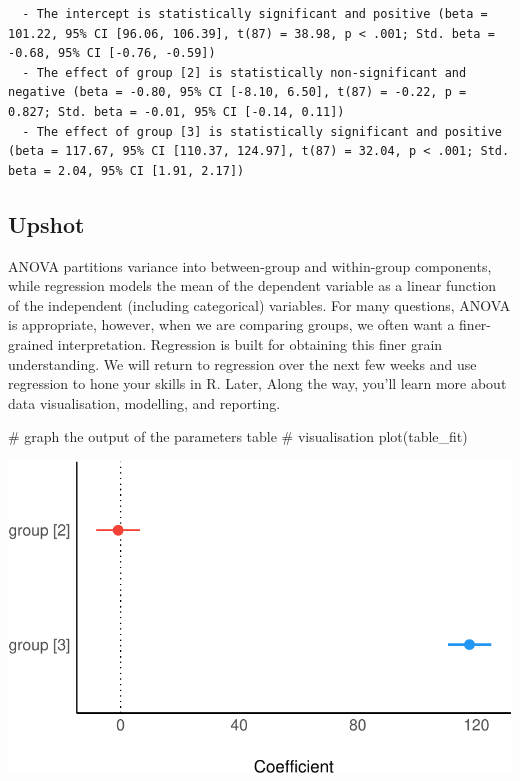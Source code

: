 \documentclass[
  singlecolumn]{article}
\newenvironment{Shaded}{}{}
\newcommand{\CommentTok}[1]{\textcolor[rgb]{0.42,0.45,0.49}{#1}}
\newcommand{\FunctionTok}[1]{\textcolor[rgb]{0.44,0.26,0.76}{#1}}
\newcommand{\NormalTok}[1]{\textcolor[rgb]{0.14,0.16,0.18}{#1}}
\theoremstyle{definition}
\theoremstyle{remark}
\begin{document}
\begin{verbatim}
  - The intercept is statistically significant and positive (beta = 101.22, 95% CI [96.06, 106.39], t(87) = 38.98, p < .001; Std. beta = -0.68, 95% CI [-0.76, -0.59])
  - The effect of group [2] is statistically non-significant and negative (beta = -0.80, 95% CI [-8.10, 6.50], t(87) = -0.22, p = 0.827; Std. beta = -0.01, 95% CI [-0.14, 0.11])
  - The effect of group [3] is statistically significant and positive (beta = 117.67, 95% CI [110.37, 124.97], t(87) = 32.04, p < .001; Std. beta = 2.04, 95% CI [1.91, 2.17])
\end{verbatim}

\subsection{Upshot}\label{upshot}

ANOVA partitions variance into between-group and within-group
components, while regression models the mean of the dependent variable
as a linear function of the independent (including categorical)
variables. For many questions, ANOVA is appropriate, however, when we
are comparing groups, we often want a finer-grained interpretation.
Regression is built for obtaining this finer grain understanding. We
will return to regression over the next few weeks and use regression to
hone your skills in R. Later, Along the way, you'll learn more about
data visualisation, modelling, and reporting.

\begin{Shaded}
\begin{Highlighting}[]
\CommentTok{\# graph the output of the parameters table}
\CommentTok{\# visualisation}
\FunctionTok{plot}\NormalTok{(table\_fit)}
\end{Highlighting}
\end{Shaded}

\includegraphics{02-content_files/figure-pdf/unnamed-chunk-15-1.pdf}
\end{document}

